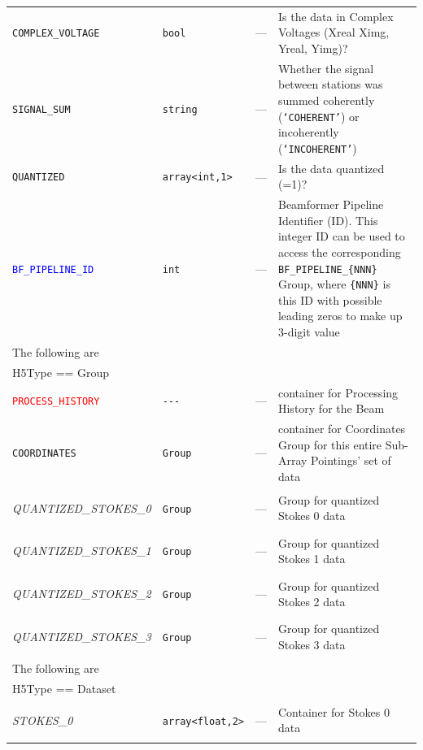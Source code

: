 \documentclass[a4paper,10pt,bibtotoc]{scrartcl}
\begin{document}
\begin{supertabular}{|lllp{5.5cm}|}
  \small{\verb|COMPLEX_VOLTAGE|}  & \verb|bool| & --- & Is the data in Complex Voltages (Xreal Ximg, Yreal, Yimg)? \\
  \small{\verb|SIGNAL_SUM|} & \verb|string| & --- & Whether the signal between stations was summed coherently (\texttt{`COHERENT'}) or incoherently (\texttt{`INCOHERENT'}) \\
  \small{\verb|QUANTIZED|}  & \verb|array<int,1>| & --- & Is the data quantized (=1)? \\
  \textcolor{blue}{\texttt{BF\_PIPELINE\_ID}} & \verb|int| & --- & Beamformer Pipeline Identifier (ID). This integer ID can be used to access the corresponding \verb|BF_PIPELINE_{NNN}| Group, where \verb|{NNN}| is this ID with possible leading zeros to make up 3-digit value \\
  \hline
  \sc The following are & \sc & \sc &\\
  \sc H5Type == Group & \sc & \sc &\\
  \hline
  \small{\textcolor{red}{\texttt{PROCESS\_HISTORY}}}  & \verb|---| & --- & container for Processing History for the Beam  \\
  \small{\verb|COORDINATES|}  & \verb|Group| & --- & container for Coordinates Group for this entire Sub-Array Pointings' set of data \\
  \begin{scriptsize}\textit{QUANTIZED\_STOKES\_0}\end{scriptsize}   & \verb|Group| & --- & Group for quantized Stokes 0 data \\
  \begin{scriptsize}\textit{QUANTIZED\_STOKES\_1}\end{scriptsize}   & \verb|Group| & --- & Group for quantized Stokes 1 data \\
  \begin{scriptsize}\textit{QUANTIZED\_STOKES\_2}\end{scriptsize}   & \verb|Group| & --- & Group for quantized Stokes 2 data \\
  \begin{scriptsize}\textit{QUANTIZED\_STOKES\_3}\end{scriptsize}   & \verb|Group| & --- & Group for quantized Stokes 3 data \\
  \hline
  \sc The following are & \sc & \sc & \\
  \sc H5Type == Dataset & \sc & \sc & \\
  \hline
  \begin{scriptsize}\textit{STOKES\_0}\end{scriptsize}  & \verb|array<float,2>| & --- & Container for Stokes 0 data \\

\end{supertabular}
\end{document}
